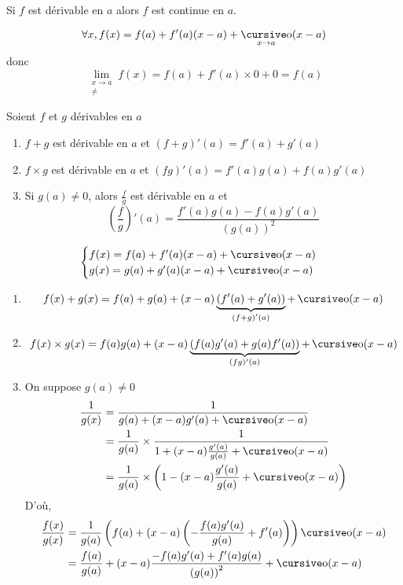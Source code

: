 \begin{prop}
	Si $f$ est dérivable en $a$ alors $f$ est continue en $a$.
\end{prop}

\begin{prv}
	\[
		\forall x, f(x) = f(a) + f'(a)(x-a) + \po_{x\to a}(x-a)
	\] donc \[
		\lim_{\substack{x \to a\\\neq }} f(x)  = f(a) + f'(a) \times 0 + 0 = f(a)
	\] 
\end{prv}

\begin{prop}
	Soient $f$ et $g$ dérivables en $a$ 
	\begin{enumerate}
		\item $f+g$ est dérivable en $a$ et $(f+g)'(a) = f'(a) + g'(a)$ 
		\item $f\times g$ est dérivable en $a$ et $(fg)'(a) = f'(a)g(a) + f(a)g'(a)$
		\item Si $g(a) \neq 0$, alors $\frac{f}{g}$ est dérivable en $a$ et  \[
		  \left( \frac{f}{g} \right) '(a) = \frac{f'(a)g(a) - f(a)g'(a)}{\left( g(a) \right) ^2}
                  \]
	\end{enumerate}
\end{prop}

\begin{prv}
	\[
		\begin{cases}
			f(x) = f(a) + f'(a) (x-a) + \po(x-a)\\ g(x) =
                        g(a) + g'(a) (x-a) + \po(x-a)\\
		\end{cases}
	\] 

	\begin{enumerate}
		\item
			\[
				f(x) + g(x) = f(a) + g(a) + (x-a)\underbrace{\left( f'(a) + g'(a) \right)}_{\left( f+g \right)'(a)} + \po(x-a)
			\] 
		\item \[
				f(x)\times g(x) = f(a)g(a) + (x-a) \underbrace{\left( f(a)g'(a) + g(a)f'(a) \right) }_{(fg)'(a)} + \po(x-a)
			\] 
		\item On suppose $g(a) \neq 0$ \\
			\begin{align*}
				\frac{1}{g(x)} &= \frac{1}{g(a) + (x-a)g'(a) + \po(x-a)}\\
				&= \frac{1}{g(a)} \times \frac{1}{1+(x-a)\frac{g'(a)}{g(a)} + \po(x-a)} \\
				&= \frac{1}{g(a)}\times \left( 1  - (x-a)\frac{g'(a)}{g(a)} + \po(x-a) \right) \\
			\end{align*}
			D'où,
			\begin{align*}
				\frac{f(x)}{g(x)} &= \frac{1}{g(a)}\left( f(a) + (x-a) \left( -\frac{f(a)g'(a)}{g(a)} + f'(a) \right) \right) \po(x-a)\\
				&= \frac{f(a)}{g(a)} + (x-a) \frac{-f(a)g'(a) + f'(a)g(a)}{\left( g(a) \right) ^2} + \po(x-a) \\
			\end{align*}
	\end{enumerate}
\end{prv}

